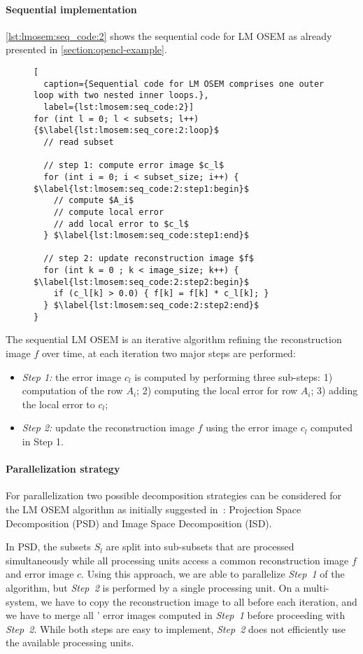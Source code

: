 \paragraph{Sequential implementation}
\autoref{lst:lmosem:seq_code:2} shows the sequential code for LM OSEM as already presented in \autoref{section:opencl-example}.
%
\begin{figure}
\begin{lstlisting}[
  caption={Sequential code for LM OSEM comprises one outer loop with two nested inner loops.},
  label={lst:lmosem:seq_code:2}]
for (int l = 0; l < subsets; l++) {$\label{lst:lmosem:seq_core:2:loop}$
  // read subset

  // step 1: compute error image $c_l$
  for (int i = 0; i < subset_size; i++) { $\label{lst:lmosem:seq_code:2:step1:begin}$
    // compute $A_i$
    // compute local error
    // add local error to $c_l$
  } $\label{lst:lmosem:seq_code:step1:end}$

  // step 2: update reconstruction image $f$
  for (int k = 0 ; k < image_size; k++) { $\label{lst:lmosem:seq_code:2:step2:begin}$
    if (c_l[k] > 0.0) { f[k] = f[k] * c_l[k]; }
  } $\label{lst:lmosem:seq_code:2:step2:end}$
}
\end{lstlisting}
\end{figure}
%
The sequential LM OSEM is an iterative algorithm refining the reconstruction image $f$ over time, at each iteration two major steps are performed:
\begin{itemize}
  \item[] \emph{Step 1:} the error image $c_l$ is computed by performing three sub-steps: 1) computation of the row $A_i$; 2) computing the local error for row $A_i$; 3) adding the local error to $c_l$;
  \item[] \emph{Step 2:} update the reconstruction image $f$ using the error image $c_l$ computed in Step 1.
\end{itemize}

\paragraph{Parallelization strategy}
For parallelization two possible decomposition strategies can be considered for the LM OSEM algorithm as initially suggested in~\cite{JonesJoKeNeReLeByBaMiCa2002}: Projection Space Decomposition (PSD) and Image Space Decomposition (ISD).

In PSD, the subsets $S_l$ are split into sub-subsets that are processed simultaneously while all processing units access a common reconstruction image $f$ and error image $c$.
Using this approach, we are able to parallelize \emph{Step~1} of the algorithm, but \emph{Step~2} is performed by a single processing unit.
On a multi-\GPU system, we have to copy the reconstruction image to all \GPUs before each iteration, and we have to merge all \GPUs' error images computed in \emph{Step~1} before proceeding with \emph{Step~2}.
While both steps are easy to implement, \emph{Step~2} does not efficiently use the available processing units.

